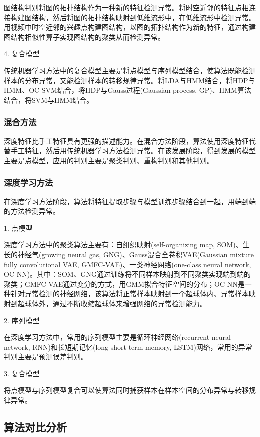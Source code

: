 \documentclass[UTF8]{ctexart}
\begin{document}
图结构判别将图的拓扑结构作为一种新的特征检测异常。将时空近邻的特征点相连接构建图结构，然后将图的拓扑结构映射到低维流形中，在低维流形中检测异常。用视频中时空近邻的兴趣点构建图结构，以图的拓扑结构作为新的特征，通过构建图结构相似性算子实现图结构的聚类从而检测异常。

4. 复合模型

传统机器学习方法中的复合模型主要是将点模型与序列模型结合，使算法既能检测样本的分布异常，又能检测样本的转移规律异常。将LDA与HMM结合，将HDP与HMM、OC-SVM结合，将HDP与Gauss过程(Gaussian process, GP)、HMM算法结合，将SVM与HMM结合。

\subsubsection{混合方法}

深度特征比手工特征具有更强的描述能力。在混合方法阶段，算法使用深度特征代替手工特征，然后用传统机器学习方法检测异常。在该发展阶段，得到发展的模型主要是点模型，应用的判别主要是聚类判别、重构判别和其他判别。

\subsubsection{深度学习方法}
在深度学习方法阶段，算法将特征提取步骤与模型训练步骤结合到一起，用端到端的方法检测异常。

1. 点模型

深度学习方法中的聚类算法主要有：自组织映射(self-organizing map, SOM)、生长的神经气(growing neural gas, GNG)、Gauss混合全卷积VAE(Gaussian mixture fully convolutional VAE, GMFC-VAE)、一类神经网络(one-class neural network, OC-NN)。其中：SOM、GNG通过训练将不同样本映射到不同聚类实现端到端的聚类；GMFC-VAE通过变分的方式，用GMM拟合特征空间的分布；OC-NN是一种针对异常检测的神经网络，该算法将正常样本映射到一个超球体内、异常样本映射到超球体外，通过不断收缩超球体来增强网络的异常检测能力。

2. 序列模型

在深度学习方法中，常用的序列模型主要是循环神经网络(recurrent neural network, RNN)和长短期记忆(long short-term memory, LSTM)网络，常用的异常判别主要是预测误差判别。

3. 复合模型

将点模型与序列模型复合可以使算法同时捕获样本在样本空间的分布异常与转移规律异常。\cite{qh2020}

\subsection{算法对比分析}
\end{document}
